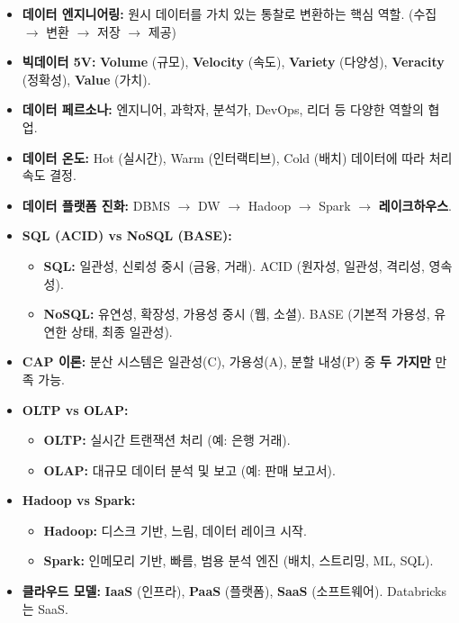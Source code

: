 \documentclass[11pt,a4paper]{article}
\begin{document}
\begin{itemize}
\begin{tcolorbox}[colback=myblue!20, colframe=blue!50!black, title=\textbf{CSCI103 Lecture 1 핵심 요약}, sharp corners, boxsep=5mm, left=3mm, right=3mm, top=3mm, bottom=3mm]
\begin{itemize}
    \item[] \textbf{데이터 엔지니어링:} 원시 데이터를 가치 있는 통찰로 변환하는 핵심 역할. (수집 $\rightarrow$ 변환 $\rightarrow$ 저장 $\rightarrow$ 제공)
    \item[] \textbf{빅데이터 5V:} \textbf{Volume} (규모), \textbf{Velocity} (속도), \textbf{Variety} (다양성), \textbf{Veracity} (정확성), \textbf{Value} (가치).
    \item[] \textbf{데이터 페르소나:} 엔지니어, 과학자, 분석가, DevOps, 리더 등 다양한 역할의 협업.
    \item[] \textbf{데이터 온도:} Hot (실시간), Warm (인터랙티브), Cold (배치) 데이터에 따라 처리 속도 결정.
    \item[] \textbf{데이터 플랫폼 진화:} DBMS $\rightarrow$ DW $\rightarrow$ Hadoop $\rightarrow$ Spark $\rightarrow$ \textbf{레이크하우스}.
    \item[] \textbf{SQL (ACID) vs NoSQL (BASE):}
    \begin{itemize}
        \item \textbf{SQL:} 일관성, 신뢰성 중시 (금융, 거래). ACID (원자성, 일관성, 격리성, 영속성).
        \item \textbf{NoSQL:} 유연성, 확장성, 가용성 중시 (웹, 소셜). BASE (기본적 가용성, 유연한 상태, 최종 일관성).
    \end{itemize}
    \item[] \textbf{CAP 이론:} 분산 시스템은 일관성(C), 가용성(A), 분할 내성(P) 중 \textbf{두 가지만} 만족 가능.
    \item[] \textbf{OLTP vs OLAP:}
    \begin{itemize}
        \item \textbf{OLTP:} 실시간 트랜잭션 처리 (예: 은행 거래).
        \item \textbf{OLAP:} 대규모 데이터 분석 및 보고 (예: 판매 보고서).
    \end{itemize}
    \item[] \textbf{Hadoop vs Spark:}
    \begin{itemize}
        \item \textbf{Hadoop:} 디스크 기반, 느림, 데이터 레이크 시작.
        \item \textbf{Spark:} 인메모리 기반, 빠름, 범용 분석 엔진 (배치, 스트리밍, ML, SQL).
    \end{itemize}
    \item[] \textbf{클라우드 모델:} \textbf{IaaS} (인프라), \textbf{PaaS} (플랫폼), \textbf{SaaS} (소프트웨어). Databricks는 SaaS.

\end{itemize}
\end{tcolorbox}
\end{itemize}
\end{document}
